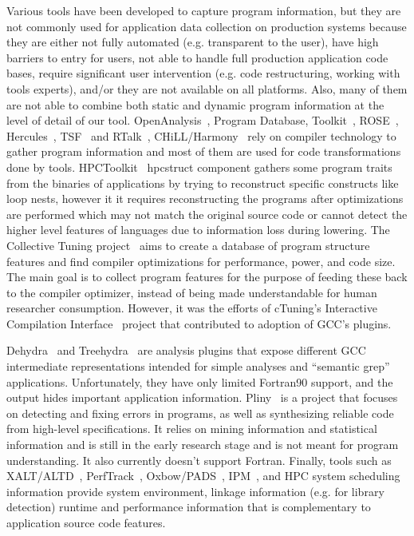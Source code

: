 Various tools have been developed to capture program information, but they are not commonly used for application data collection on production systems because they are either not fully automated (e.g. transparent to the user), have high barriers to entry for users, not able to handle full production application code bases, require significant user intervention (e.g. code restructuring, working with tools experts), and/or they are  not available on all platforms. Also, many of them are not able to combine both static and dynamic program information at the level of detail of our tool. OpenAnalysis~\cite{Strout:2005}, Program Database, Toolkit~\cite{Lindlan2000}, ROSE~\cite{Willcock:2009:RGP:1621607.1621611}, Hercules~\cite{kartsaklis2012hercules}, TSF~\cite{bodin1998user} and RTalk~\cite{SPE:SPE1035}, CHiLL/Harmony~\cite{tiwari2009scalable} rely on compiler technology to gather program information and most of them are used for code transformations done by tools. HPCToolkit~\cite{Adhianto2010}  
hpcstruct component gathers some program traits from the binaries of applications by trying to reconstruct specific constructs like loop nests, however it
it requires reconstructing the programs after optimizations are performed which may not match the original source code or 
cannot detect the higher level features of languages due to information loss during lowering. The Collective Tuning project~\cite{Fursin:2016} aims to create a database of program structure features and find compiler optimizations for performance, power, and code size. The main goal is to collect program features for the purpose of feeding these back to the compiler optimizer, instead of being made understandable for human researcher consumption. However, it was the efforts of cTuning's Interactive Compilation Interface~\cite{ctuning-ici} project that contributed to adoption of GCC's plugins. 

Dehydra~\cite{dehydra} and Treehydra~\cite{treehydra} are analysis plugins that expose different GCC intermediate representations intended for simple analyses and “semantic grep” applications. Unfortunately, they have only limited Fortran90 support, and the output hides important application information. Pliny~\cite{Feser:2015} is a project that focuses on detecting and fixing errors in programs, as well as synthesizing reliable code from high-level specifications. It relies on mining information and statistical information and is still in the early research stage and is not meant for program understanding. It also currently doesn't support Fortran. Finally, tools such as XALT/ALTD~\cite{xalt,xalt2}, PerfTrack~\cite{Karavanic:2005:IDT:1105760.1105804}, Oxbow/PADS~\cite{oxbowpads}, IPM~\cite{5695625}, and HPC system scheduling information provide system environment, linkage information (e.g. for library detection) runtime and performance information that is complementary to application source code features. 

